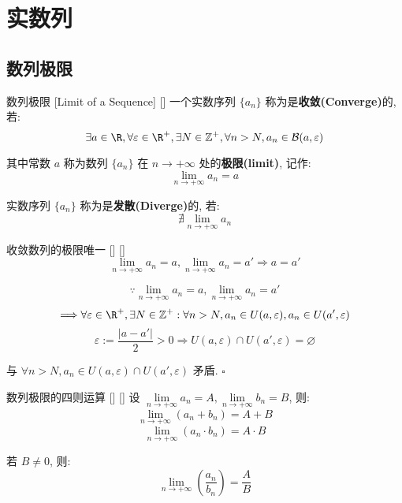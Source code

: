 \documentclass[UTF8]{ctexart}
\begin{document}
        \section{实数列}
  
            \subsection{数列极限}
			
			\begin{dfn}
			    []
			    {数列极限}
			    [Limit of a Sequence]
			    []
				一个实数序列 \(\{a_n\}\) 称为是\textbf{收敛(Converge)}的, 若: 
				\[\exists a\in \R, \forall \varepsilon\in\R^+, \exists N\in\mathbb{Z}^+, \forall n>N, a_n\in\mathcal{B}(a,\varepsilon)\]
				
				其中常数 \(a\) 称为数列 \(\{a_n\}\) 在 \(n\to+\infty\) 处的\textbf{极限(limit)}, 记作: 
				\[\lim_{n\to+\infty}a_n=a\]
				
				实数序列 \(\{a_n\}\) 称为是\textbf{发散(Diverge)}的, 若: 
				\[\nexists\lim_{n\to+\infty}a_n\]
			\end{dfn}
			
			\begin{ppt}
			    []
			    {收敛数列的极限唯一}
			    []
			    []
				\[\lim_{n\to+\infty}a_n=a, \lim_{n\to+\infty}a_n=a'\Longrightarrow a=a'\]
			\end{ppt}
			
			\begin{prf}
				\[\because\lim_{n\to+\infty}a_n=a, \lim_{n\to+\infty}a_n=a'\]
				\[\Longrightarrow\forall\varepsilon\in\R^+, \exists N\in\mathbb{Z}^+: \forall n>N, a_n\in U(a,\varepsilon), a_n\in U(a',\varepsilon)\]
				\[\varepsilon:=\frac{|a-a'|}{2}>0\Longrightarrow U(a,\varepsilon)\cap U(a',\varepsilon)=\varnothing\]
				
				与 \(\forall n>N, a_n\in U(a,\varepsilon)\cap U(a',\varepsilon)\) 矛盾. \(\square\)
                \end{prf}
				
			\begin{ppt}
			    []
			    {数列极限的四则运算}
			    []
			    []
				设 \(\lim\limits_{n\to+\infty}a_n=A, \lim\limits_{n\to+\infty}b_n=B\), 则: 
                \[\lim\limits_{n\to+\infty}(a_n+b_n)=A+B\]
                \[\lim\limits_{n\to+\infty}(a_n\cdot b_n)=A\cdot B\]

                若 \(B\neq 0\), 则: 
                \[\lim\limits_{n\to+\infty}(\frac{a_n}{b_n})=\frac{A}{B}\]
			\end{ppt}
			
\end{document}
